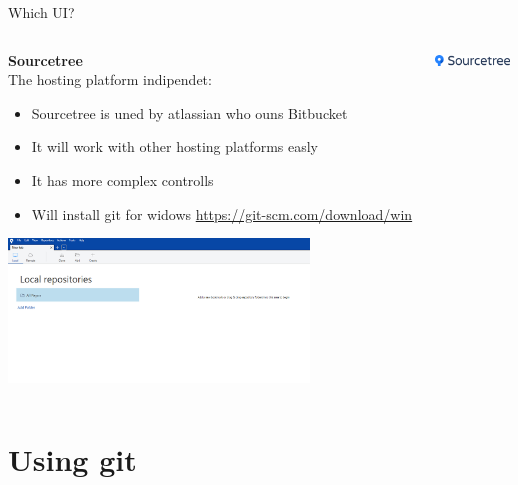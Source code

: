 \documentclass[10pt]{beamer}
\begin{document}
\begin{frame}[fragile]{Which UI?}
  \begin{columns}[T]
    \begin{column}{.8\textwidth}
  	\textbf{Sourcetree\\}
	The hosting platform indipendet:
	\begin{itemize}
		\item Sourcetree is uned by atlassian who ouns Bitbucket
		\item It will work with other hosting platforms easly
		\item It has more complex controlls
		\item Will install git for widows \url{https://git-scm.com/download/win}
	\end{itemize}
	\includegraphics[width=8cm]{Figs/ST/ST_00}         
    \end{column}
    \begin{column}{.2\textwidth}
	\includegraphics[width=2cm]{Figs/git/Sourcetree} \newline  \newline  \newline 
    \end{column}
  \end{columns}
\end{frame}


\section{Using git}
\end{document}
